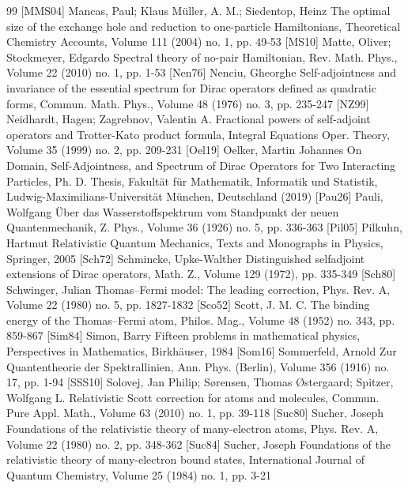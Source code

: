 \begin{thebibliography}{99}
 [MMS04] Mancas, Paul; Klaus Müller, A. M.; Siedentop, Heinz The optimal size of the exchange hole and reduction to one-particle Hamiltonians, Theoretical Chemistry Accounts, Volume 111 (2004) no. 1, pp. 49-53
 [MS10] Matte, Oliver; Stockmeyer, Edgardo Spectral theory of no-pair Hamiltonian, Rev. Math. Phys., Volume 22 (2010) no. 1, pp. 1-53
 [Nen76] Nenciu, Gheorghe Self-adjointness and invariance of the essential spectrum for Dirac operators defined as quadratic forms, Commun. Math. Phys., Volume 48 (1976) no. 3, pp. 235-247
 [NZ99] Neidhardt, Hagen; Zagrebnov, Valentin A. Fractional powers of self-adjoint operators and Trotter-Kato product formula, Integral Equations Oper. Theory, Volume 35 (1999) no. 2, pp. 209-231
 [Oel19] Oelker, Martin Johannes On Domain, Self-Adjointness, and Spectrum of Dirac Operators for Two Interacting Particles, Ph. D. Thesis, Fakultät für Mathematik, Informatik und Statistik, Ludwig-Maximilians-Universität München, Deutschland (2019)
 [Pau26] Pauli, Wolfgang Über das Wasserstoffspektrum vom Standpunkt der neuen Quantenmechanik, Z. Phys., Volume 36 (1926) no. 5, pp. 336-363
 [Pil05] Pilkuhn, Hartmut Relativistic Quantum Mechanics, Texts and Monographs in Physics, Springer, 2005
 [Sch72] Schmincke, Upke-Walther Distinguished selfadjoint extensions of Dirac operators, Math. Z., Volume 129 (1972), pp. 335-349
 [Sch80] Schwinger, Julian Thomas–Fermi model: The leading correction, Phys. Rev. A, Volume 22 (1980) no. 5, pp. 1827-1832
 [Sco52] Scott, J. M. C. The binding energy of the Thomas–Fermi atom, Philos. Mag., Volume 48 (1952) no. 343, pp. 859-867
 [Sim84] Simon, Barry Fifteen problems in mathematical physics, Perspectives in Mathematics, Birkhäuser, 1984
 [Som16] Sommerfeld, Arnold Zur Quantentheorie der Spektrallinien, Ann. Phys. (Berlin), Volume 356 (1916) no. 17, pp. 1-94
 [SSS10] Solovej, Jan Philip; Sørensen, Thomas Østergaard; Spitzer, Wolfgang L. Relativistic Scott correction for atoms and molecules, Commun. Pure Appl. Math., Volume 63 (2010) no. 1, pp. 39-118
 [Suc80] Sucher, Joseph Foundations of the relativistic theory of many-electron atoms, Phys. Rev. A, Volume 22 (1980) no. 2, pp. 348-362
 [Suc84] Sucher, Joseph Foundations of the relativistic theory of many-electron bound states, International Journal of Quantum Chemistry, Volume 25 (1984) no. 1, pp. 3-21

\end{thebibliography}
